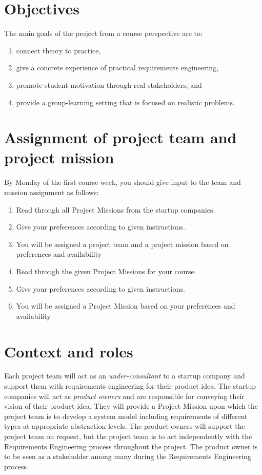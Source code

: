 \maketitle
\vspace{-1cm}

\section{Objectives}
The main goals of the project from a course perspective are to:
\begin{enumerate}[noitemsep]
\item connect theory to practice,
\item give a concrete experience of practical requirements engineering,
\item promote student motivation through real stakeholders, and
\item provide a group-learning setting that is focused on realistic problems.
\end{enumerate}

\section{Assignment of project team and project mission}
By Monday of the first course week, you should give input to the team and mission
assignment as follows:
\begin{enumerate}[noitemsep]
\ifteknolog
   \item Read through all Project Missions from the startup companies.
   \item  Give your preferences according to given instructions.
   \item  You will be assigned a project team and a project mission based on preferences
   and availability
\else
   \item Read through the given Project Missions for your course.
   \item  Give your preferences according to given instructions.
   \item  You will be assigned a Project Mission based on your preferences
   and availability
\fi
\end{enumerate}

\ifteknolog
   \section{Context and roles}

   \noindent Each project team will act as an \textit{under-consultant} to a startup company and support them with requirements engineering for their product idea. The startup companies will act as \textit{product owners} and are responsible for conveying their vision of their product idea. They will provide a Project Mission upon which the project team is to develop a system model including requirements of different types at appropriate abstraction levels. The product owners will support the project team on request, but the project team is to act independently with the Requirements Engineering process throughout the project. The product owner is to be seen as a stakeholder among many during the Requirements Engineering process.
   \newline

